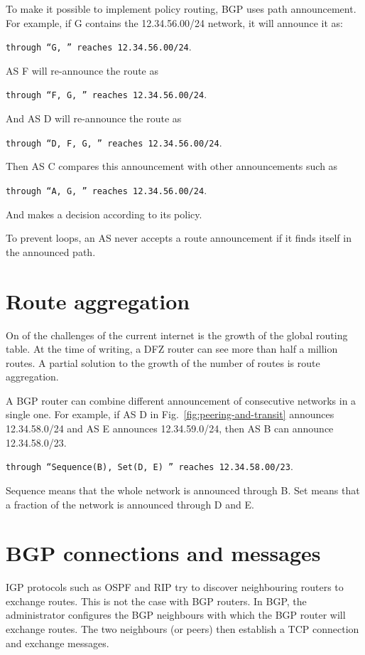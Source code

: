 To make it possible to implement policy routing, BGP uses path announcement. 
For example, if G contains the 12.34.56.00/24 network, it will announce it as:

\texttt{through ``G, '' reaches 12.34.56.00/24}.

AS F will re-announce the route as 

\texttt{through ``F, G, '' reaches 12.34.56.00/24}.

And AS D will re-announce the route as 

\texttt{through ``D, F, G, '' reaches 12.34.56.00/24}.

Then AS C compares this announcement with other announcements such as 

\texttt{through ``A, G, '' reaches 12.34.56.00/24}.

And makes a decision according to its policy.

To prevent loops, an AS never accepts a route announcement if it finds itself in the announced path.

\section{Route aggregation}

On of the challenges of the current internet is the growth of the global routing table.
At the time of writing, a DFZ router can see more than half a million routes.
A partial solution to the growth of the number of routes is route aggregation.

A BGP router can combine different announcement of consecutive networks in a single one.
For example, if AS D in Fig.~\ref{fig:peering-and-transit} announces 12.34.58.0/24 and AS E announces 12.34.59.0/24, then AS B can announce 12.34.58.0/23.

\texttt{through ``Sequence(B), Set(D, E) '' reaches 12.34.58.00/23}.

Sequence means that the whole network is announced through B.
Set means that a fraction of the network is announced through D and E.

\section{BGP connections and messages}

IGP protocols such as OSPF and RIP try to discover neighbouring routers to exchange routes.
This is not the case with BGP routers.
In BGP, the administrator configures the BGP neighbours with which the BGP router will exchange routes.
The two neighbours (or peers) then establish a TCP connection and exchange messages.

